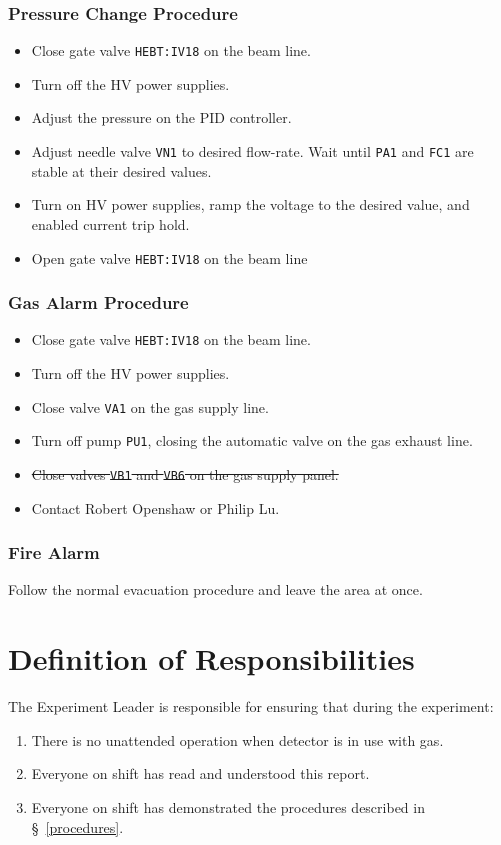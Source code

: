 \subsubsection{Pressure Change Procedure}
\begin{itemize}
\setlength{\itemsep}{0pt}
\setlength{\parskip}{0pt}
\setlength{\parsep}{0pt}
\item Close gate valve \texttt{HEBT:IV18} on the beam line.
\item Turn off the HV power supplies.
\item Adjust the pressure on the PID controller.
\item Adjust needle valve \texttt{VN1} to desired flow-rate.  Wait until \texttt{PA1} and \texttt{FC1} are stable at their desired values.
\item Turn on HV power supplies, ramp the voltage to the desired value, and enabled current trip hold.
\item Open gate valve \texttt{HEBT:IV18} on the beam line
\end{itemize}
\subsubsection{Gas Alarm Procedure}
\begin{itemize}
\setlength{\itemsep}{0pt}
\setlength{\parskip}{0pt}
\setlength{\parsep}{0pt}

\item Close gate valve \texttt{HEBT:IV18} on the beam line.
\item Turn off the HV power supplies.
\item Close valve \texttt{VA1} on the gas supply line.
\item Turn off pump \texttt{PU1}, closing the automatic valve on the gas exhaust line.
\item \sout{Close valves \texttt{VB1} and \texttt{VB6} on the gas supply panel.}
\item Contact Robert Openshaw or Philip Lu.
\end{itemize}
\subsubsection{Fire Alarm}
Follow the normal evacuation procedure and leave the area at once.

\section{Definition of Responsibilities}
The Experiment Leader is responsible for ensuring that during the experiment:
\begin{enumerate}
\setlength{\itemsep}{0pt}
\setlength{\parskip}{0pt}
\setlength{\parsep}{0pt}
\item  There is no unattended operation when detector is in use with gas.
\item  Everyone on shift has read and understood this report.
\item  Everyone on shift has demonstrated the procedures described in \S~\ref{procedures}.
\end{enumerate}

